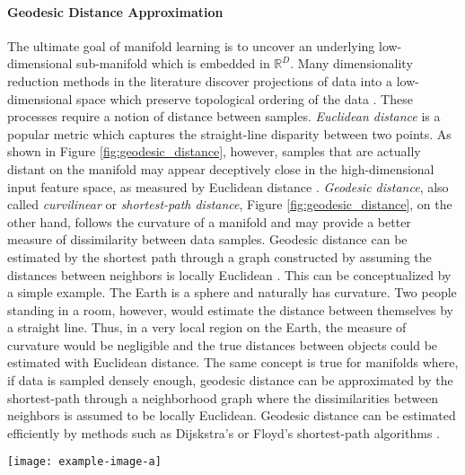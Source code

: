 \paragraph{Geodesic Distance Approximation}
The ultimate goal of manifold learning is to uncover an underlying low-dimensional sub-manifold which is embedded in $\mathbb{R}^{D}$.  Many dimensionality reduction methods in the literature discover projections of data into a low-dimensional space which preserve topological ordering of the data \citep{Kegl2008PrincipalManifoldsTextbook}.  These processes require a notion of distance between samples.  \textit{Euclidean distance} is a popular metric which captures the straight-line disparity between two points. As shown in Figure \ref{fig:geodesic_distance}, however, samples that are actually distant on the manifold may appear deceptively close in the high-dimensional input feature space, as measured by Euclidean distance \citep{Tenenbaum2000Isomap}. \textit{Geodesic distance}, also called \textit{curvilinear} or \textit{shortest-path distance}, Figure \ref{fig:geodesic_distance}, on the other hand, follows the curvature of a manifold and may provide a better measure of dissimilarity between data samples.  Geodesic distance can be estimated by the shortest path through a graph constructed by assuming the distances between neighbors is locally Euclidean \citep{Sorzano2014DRReview}.  This can be conceptualized by a simple example.  The Earth is a sphere and naturally has curvature.  Two people standing in a room, however, would estimate the distance between themselves by a straight line.  Thus, in a very local region on the Earth, the measure of curvature would be negligible and the true distances between objects could be estimated with Euclidean distance. The same concept is true for manifolds where, if data is sampled densely enough, geodesic distance can be approximated by the shortest-path through a neighborhood graph where the dissimilarities between neighbors is assumed to be locally Euclidean.  Geodesic distance can be estimated efficiently by methods such as Dijskstra's or Floyd's shortest-path algorithms \citep{Tenenbaum2000Isomap}. 
\begin{center}
	\begin{figure*}[h]
		\centering
		\texttt{[image: example-image-a]}
		\caption[Demonstration of geodesic distance]{Demonstration of geodesic distance}
		\label{fig:geodesic_distance}
	\end{figure*}
\end{center}



